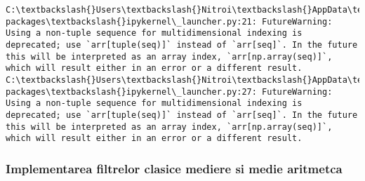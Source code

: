 \documentclass[11pt]{article}
\begin{document}
    \begin{Verbatim}[commandchars=\\\{\}]
C:\textbackslash{}Users\textbackslash{}Nitroi\textbackslash{}AppData\textbackslash{}Local\textbackslash{}Continuum\textbackslash{}anaconda3\textbackslash{}envs\textbackslash{}PAIC\textbackslash{}lib\textbackslash{}site-packages\textbackslash{}ipykernel\_launcher.py:21: FutureWarning: Using a non-tuple sequence for multidimensional indexing is deprecated; use `arr[tuple(seq)]` instead of `arr[seq]`. In the future this will be interpreted as an array index, `arr[np.array(seq)]`, which will result either in an error or a different result.
C:\textbackslash{}Users\textbackslash{}Nitroi\textbackslash{}AppData\textbackslash{}Local\textbackslash{}Continuum\textbackslash{}anaconda3\textbackslash{}envs\textbackslash{}PAIC\textbackslash{}lib\textbackslash{}site-packages\textbackslash{}ipykernel\_launcher.py:27: FutureWarning: Using a non-tuple sequence for multidimensional indexing is deprecated; use `arr[tuple(seq)]` instead of `arr[seq]`. In the future this will be interpreted as an array index, `arr[np.array(seq)]`, which will result either in an error or a different result.

    \end{Verbatim}

    \hypertarget{implementarea-filtrelor-clasice-mediere-si-medie-aritmetca}{%
\subsubsection{Implementarea filtrelor clasice mediere si medie
aritmetca}\label{implementarea-filtrelor-clasice-mediere-si-medie-aritmetca}}
\end{document}
